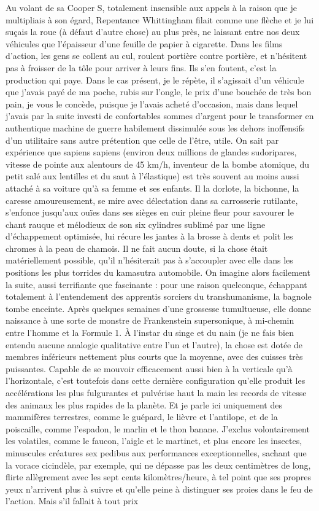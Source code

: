 Au volant de sa Cooper S, totalement insensible aux appels à la raison que je multipliais à son égard, Repentance Whittingham filait comme une flèche et je lui suçais la roue (à défaut d’autre chose) au plus près, ne laissant entre nos deux véhicules que l’épaisseur d’une feuille de papier à cigarette. Dans les films d’action, les gens se collent au cul, roulent portière contre portière, et n’hésitent pas à froisser de la tôle pour arriver à leurs fins. Ils s’en foutent, c’est la production qui paye. Dans le cas présent, je le répète, il s’agissait d’un véhicule que j’avais payé de ma poche, rubis sur l’ongle, le prix d’une bouchée de très bon pain, je vous le concède, puisque je l’avais acheté d’occasion, mais dans lequel j’avais par la suite investi de confortables sommes d’argent pour le transformer en authentique machine de guerre habilement dissimulée sous les dehors inoffensifs d’un utilitaire sans autre prétention que celle de l’être, utile. On sait par expérience que sapiens sapiens (environ deux millions de glandes sudoripares, vitesse de pointe aux alentours de 45 km/h, inventeur de la bombe atomique, du petit salé aux lentilles et du saut à l’élastique) est très souvent au moins aussi attaché à sa voiture qu’à sa femme et ses enfants. Il la dorlote, la bichonne, la caresse amoureusement, se mire avec délectation dans sa carrosserie rutilante, s’enfonce jusqu’aux ouïes dans ses sièges en cuir pleine fleur pour savourer le chant rauque et mélodieux de son six cylindres sublimé par une ligne d’échappement optimisée, lui récure les jantes à la brosse à dents et polit les chromes à la peau de chamois. Il ne fait aucun doute, si la chose était matériellement possible, qu’il n’hésiterait pas à s’accoupler avec elle dans les positions les plus torrides du kamasutra automobile. On imagine alors facilement la suite, aussi terrifiante que fascinante : pour une raison quelconque, échappant totalement à l’entendement des apprentis sorciers du transhumanisme, la bagnole tombe enceinte. Après quelques semaines d’une grossesse tumultueuse, elle donne naissance à une sorte de monstre de Frankenstein supersonique, à mi-chemin entre l’homme et la Formule 1. À l’instar du singe et du nain (je ne fais bien entendu aucune analogie qualitative entre l’un et l’autre), la chose est dotée de membres inférieurs nettement plus courts que la moyenne, avec des cuisses très puissantes. Capable de se mouvoir efficacement aussi bien à la verticale qu’à l’horizontale, c’est toutefois dans cette dernière configuration qu’elle produit les accélérations les plus fulgurantes et pulvérise haut la main les records de vitesse des animaux les plus rapides de la planète. Et je parle ici uniquement des mammifères terrestres, comme le guépard, le lièvre et l’antilope, et de la poiscaille, comme l’espadon, le marlin et le thon banane. J’exclus volontairement les volatiles, comme le faucon, l’aigle et le martinet, et plus encore les insectes, minuscules créatures sex pedibus aux performances exceptionnelles, sachant que la vorace cicindèle, par exemple, qui ne dépasse pas les deux centimètres de long, flirte allègrement avec les sept cents kilomètres/heure, à tel point que ses propres yeux n’arrivent plus à suivre et qu’elle peine à distinguer ses proies dans le feu de l’action. Mais s’il fallait à tout prix 